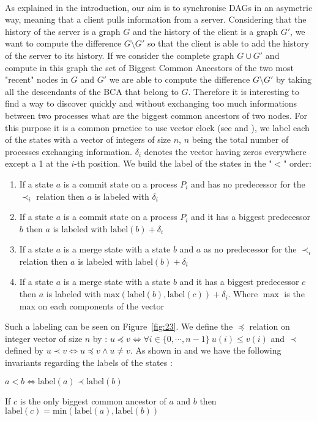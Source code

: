 \paragraph{} As explained in the introduction, our aim is to synchronise DAGs in an asymetric way, meaning that a client pulls information from a server. Considering that the history of the server is a graph $G$ and the history of the client is a graph $G'$, we want to compute the difference $G\setminus G'$ so that the client is able to add the history of the server to its history. If we consider the complete graph $G\cup G'$ and compute in this graph the set of Biggest Common Ancestors of the two most "recent" nodes in $G$ and $G'$ we are able to compute the difference $G\setminus G'$ by taking all the descendants of the BCA that belong to $G$. Therefore it is interesting to find a way to discover quickly and without exchanging too much informations between two processes what are the biggest common ancestors of two nodes. For this purpose it is a common practice to use vector clock (see \cite{fidge1988timestamps} and \cite{VirtTimeGlobStates}), we label each of the states with a vector of integers of size 
$n$, $n$ being the total number of processes exchanging information. $\delta_i$ denotes the vector having zeros everywhere except a 1 at the $i$-th position. We build the label of the states in the "$<$" order:
\begin{enumerate}
 \item If a state $a$ is a commit state on a process $P_i$ and has no predecessor for the $\prec_i$ relation then $a$ is labeled with $\delta_i$
 \item If a state $a$ is a commit state on a process $P_i$ and it has a biggest predecessor $b$ then $a$ is labeled with $\mathrm{label}(b) + \delta_i$
 \item If a state $a$ is a merge state with a state $b$ and $a$ as no predecessor for the $\prec_i$ relation then $a$ is labeled with $\mathrm{label}(b) + \delta_i$
 \item If a state $a$ is a merge state with a state $b$ and it has a biggest predecessor $c$ then $a$ is labeled with $\mathrm{max}(\mathrm{label}(b),\mathrm{label}(c)) + \delta_i$. Where $\max$ is the max on each components of the vector
\end{enumerate}
Such a labeling can be seen on Figure~\ref{fig:23}. We define the $\preccurlyeq$ relation on integer vector of size $n$ by : $u \preccurlyeq v \Leftrightarrow \forall i \in \{0,\cdots,n-1\}\  u(i) \leq v(i)$ and $\prec$ defined by $u \prec v \Leftrightarrow u \preccurlyeq v \wedge u \neq v$. As shown in \cite{t1} and \cite{t2} we have the following invariants regarding the labels of the states :
\begin{proposition}
  \label{prop1}
 $ a < b \Leftrightarrow \mathrm{label}(a) \prec  \mathrm{label}(b)$
\end{proposition}
\begin{proposition}
  \label{propmin}
 If $c$ is the only biggest common ancestor of $a$ and $b$ then $\mathrm{label}(c) = \mathrm{min}(\mathrm{label}(a),\mathrm{label}(b))$
\end{proposition}

